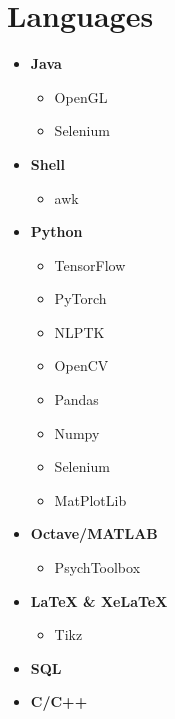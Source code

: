\documentclass[]{chandan-cv}
\begin{document}
\begin{minipage}[t]{0.27\textwidth}


\section{Languages}
	\begin{itemize}
		\setlength\itemsep{-0.2em}
		\item \textbf{Java}
			\begin{itemize}
				\setlength\itemsep{-0.15em}
				\item OpenGL
				\item Selenium
			\end{itemize}
		\item \textbf{Shell}
			\begin{itemize}
				\setlength\itemsep{-0.15em}
				\item awk
			\end{itemize}
		\item \textbf{Python}
			\begin{itemize}
				\setlength\itemsep{-0.15em}
				\item TensorFlow
				\item PyTorch
				\item NLPTK
				\item OpenCV
				\item Pandas
				\item Numpy
				\item Selenium
				\item MatPlotLib
			\end{itemize}
		\item \textbf{Octave/MATLAB}
			\begin{itemize}
				\setlength\itemsep{-0.15em}
				\item PsychToolbox
			\end{itemize}
		\item \textbf{LaTeX \& XeLaTeX}
			\begin{itemize}
				\setlength\itemsep{-0.15em}
				\item Tikz
			\end{itemize}
		\item \textbf{SQL}
		\item \textbf{C/C++}
	\end{itemize}
\sectionsep



\end{minipage}
\end{document}
